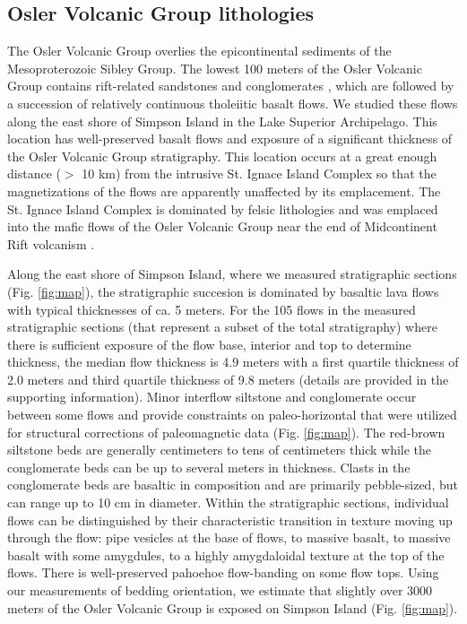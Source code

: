 \documentclass[draft,gc]{AGUTeX}
\begin{document}
\begin{article}
\subsection{Osler Volcanic Group lithologies}
The Osler Volcanic Group overlies the epicontinental sediments of the Mesoproterozoic Sibley Group. The lowest 100 meters of the Osler Volcanic Group contains rift-related sandstones and conglomerates \citep{Hollings2007a}, which are followed by a succession of relatively continuous tholeiitic basalt flows. We studied these flows along the east shore of Simpson Island in the Lake Superior Archipelago. This location has well-preserved basalt flows and exposure of a significant thickness of the Osler Volcanic Group stratigraphy. This location occurs at a great enough distance ($>$ 10 km) from the intrusive St. Ignace Island Complex so that the magnetizations of the flows are apparently unaffected by its emplacement. The St. Ignace Island Complex is dominated by felsic lithologies and was emplaced into the mafic flows of the Osler Volcanic Group near the end of Midcontinent Rift volcanism \citep{Hollings2007b}.

Along the east shore of Simpson Island, where we measured stratigraphic sections (Fig. \ref{fig:map}), the stratigraphic succesion is dominated by basaltic lava flows with typical thicknesses of ca. 5 meters. For the 105 flows in the measured stratigraphic sections (that represent a subset of the total stratigraphy) where there is sufficient exposure of the flow base, interior and top to determine thickness, the median flow thickness is 4.9 meters with a first quartile thickness of 2.0 meters and third quartile thickness of 9.8 meters (details are provided in the supporting information). Minor interflow siltstone and conglomerate occur between some flows and provide constraints on paleo-horizontal that were utilized for structural corrections of paleomagnetic data (Fig. \ref{fig:map}). The red-brown siltstone beds are generally centimeters to tens of centimeters thick while the conglomerate beds can be up to several meters in thickness. Clasts in the conglomerate beds are basaltic in composition and are primarily pebble-sized, but can range up to 10 cm in diameter. Within the stratigraphic sections, individual flows can be distinguished by their characteristic transition in texture moving up through the flow: pipe vesicles at the base of flows, to massive basalt, to massive basalt with some amygdules, to a highly amygdaloidal texture at the top of the flows. There is well-preserved pahoehoe flow-banding on some flow tops. Using our measurements of bedding orientation, we estimate that slightly over 3000 meters of the Osler Volcanic Group is exposed on Simpson Island (Fig. \ref{fig:map}).


\end{article}
\end{document}
